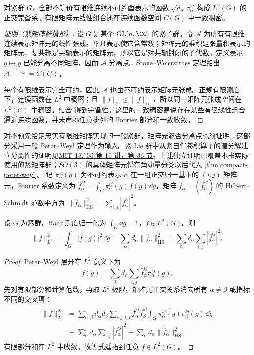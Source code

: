 \begin{theorem}
对紧群 $G$，全部不等价有限维连续不可约酉表示的函数 $\sqrt{d_\alpha}\,\pi_\alpha^{ij}$ 构成 $L^2(G)$ 的正交完备系。有限矩阵元线性组合还在连续函数空间 $C(G)$ 中一致稠密。
\label{thm:compact-peter-weyl}
\end{theorem}

\begin{proof}[证明（紧矩阵群情形）]
设 $G$ 是某个 $\operatorname{GL}(n,\CC)$ 的紧子群。令 $\mathcal A$ 为所有有限维连续表示矩阵元的线性张成。平凡表示使它含常数；矩阵元的乘积是张量积表示的矩阵元，复共轭是共轭表示的矩阵元，所以它是对共轭封闭的子代数。定义表示 $g\mapsto g$ 已能分离不同矩阵，因而 $\mathcal A$ 分离点。Stone--Weierstrass 定理给出 $\overline{\mathcal A}^{\|\cdot\|_\infty}=C(G)$。

每个有限维表示完全可约，因此 $\mathcal A$ 也由不可约表示矩阵元张成。正规有限测度下，连续函数在 $L^2$ 中稠密；且 $\|f\|_2\le\|f\|_\infty$，所以同一矩阵元张成空间在 $L^2(G)$ 中稠密。结合  得到完备性。这里的一致稠密是说存在某些有限线性组合逼近连续函数，并未声称任意排列的 Fourier 部分和一致收敛。
\end{proof}

对不预先给定忠实有限维矩阵实现的一般紧群，矩阵元能否分离点也须证明；这部分采用一般 Peter--Weyl 定理作为输入。紧 Lie 群中从紧自伴卷积算子的谱分解建立分离性的证明见\href{https://ocw.mit.edu/courses/18-755-lie-groups-and-lie-algebras-ii-spring-2024/mit18_755_s24_lec10.pdf}{MIT 18.755 第 10 讲，第 36 节}。上述独立证明已覆盖本书实际使用的紧矩阵群；$SO(3)$ 的具体矩阵元将在角动量分类以后代入 \cref{thm:compact-peter-weyl}。
记 $\pi_\alpha^{ij}(g)$ 为不可约表示 $\alpha$ 在一组正交归一基下的 $(i,j)$ 矩阵元，Fourier 系数定义为 $\widehat f_\alpha^{ij}=\int_G\overline{\pi_\alpha^{ij}(g)}\,f(g)\,\dd g$，矩阵 $\widehat f_\alpha=(\widehat f_\alpha^{ij})$ 的 Hilbert--Schmidt 范数平方为 $\|\widehat f_\alpha\|_{\mathrm{HS}}^2=\sum_{i,j}|\widehat f_\alpha^{ij}|^2$。
\begin{proposition}[Plancherel 公式]
设 $G$ 为紧群，Haar 测度归一化为 $\int_G\dd g=1$，$f\in L^2(G)$。则
\[
\|f\|_{L^2}^2=\int_G|f(g)|^2\,\dd g
=\sum_\alpha d_\alpha\|\hat f_\alpha\|_{\text{HS}}^2
=\sum_\alpha d_\alpha\sum_{i,j}|\hat f_\alpha^{ij}|^2.
\]
\end{proposition}

\begin{proof}
Peter--Weyl 展开在 \(L^2\) 意义下为
\[
f(g)=\sum_\alpha d_\alpha\sum_{i,j}
\widehat f_\alpha^{ij}\pi_\alpha^{ij}(g).
\]
先对有限部分和计算范数，再取 \(L^2\) 极限。矩阵元正交关系消去所有 \(\alpha\neq\beta\) 或指标不同的交叉项：
\begin{align*}
\|f\|_2^2
&=\sum_{\alpha,\beta}d_\alpha d_\beta
\sum_{i,j,k,l}
\overline{\widehat f_\alpha^{ij}}\widehat f_\beta^{kl}
\int_G\overline{\pi_\alpha^{ij}(g)}\pi_\beta^{kl}(g)\,\dd g\\
&=\sum_\alpha d_\alpha\sum_{i,j}
|\widehat f_\alpha^{ij}|^2
=\sum_\alpha d_\alpha\|\widehat f_\alpha\|_{\mathrm{HS}}^2.
\end{align*}
有限部分和在 \(L^2\) 中收敛，故等式延拓到任意 \(f\in L^2(G)\)。
\end{proof}

